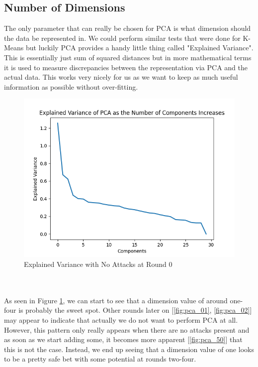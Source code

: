 \subsection{Number of Dimensions}
The only parameter that can really be chosen for PCA is what dimension should the data be represented in.
We could perform similar tests that were done for K-Means but luckily PCA provides a handy little thing called "Explained Variance".
This is essentially just sum of squared distances but in more mathematical terms it is used to measure discrepancies between the representation via PCA and the actual data.
This works very nicely for us as we want to keep as much useful information as possible without over-fitting.
\begin{figure}[htbp]
	\centering
    \includegraphics[scale=0.5]{my_agg/graphs/0_r0.png}
	\caption{Explained Variance with No Attacks at Round 0}
	\label{fig:pca_00}
\end{figure}
\\ \\
As seen in Figure \ref{fig:pca_00}, we can start to see that a dimension value of around one-four is probably the sweet spot.
Other rounds later on [\ref{fig:pca_01}, \ref{fig:pca_02}] may appear to indicate that actually we do not want to perform PCA at all.
However, this pattern only really appears when there are no attacks present and as soon as we start adding some, it becomes more apparent [\ref{fig:pca_50}] that this is not the case.
Instead, we end up seeing that a dimension value of one looks to be a pretty safe bet with some potential at rounds two-four.


